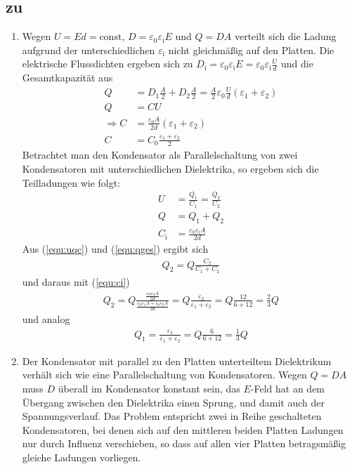 \documentclass[a4paper]{scrartcl}
\begin{document}
\subsection{zu }
\label{lsg:KondensatorDielektrika}
\begin{enumerate}[noitemsep]
  \item Wegen $U = Ed = \text{const}$, $D = \varepsilon_0\varepsilon_\text{i}E$ und $Q = DA$ verteilt sich die Ladung aufgrund der unterschiedlichen $\varepsilon_\text{i}$ nicht gleichmäßig auf den Platten. Die elektrische Flussdichten ergeben sich zu $D_\text{i} = \varepsilon_0\varepsilon_\text{i}E = \varepsilon_0\varepsilon_\text{i}\frac{U}{d}$ und die Gesamtkapazität aus 
    \begin{align*}
      Q &= D_1\frac{A}{2} + D_2\frac{A}{2} = \frac{A}{2} \varepsilon_0 \frac{U}{d}(\varepsilon_1+\varepsilon_2)\\
      Q &= CU\\
      \Rightarrow C & = \frac{\varepsilon_0A}{2d}(\varepsilon_1+\varepsilon_2)\\
      C&=C_0 \frac{\varepsilon_1+\varepsilon_2}{2}
    \end{align*}
    Betrachtet man den Kondensator als Parallelschaltung von zwei Kondensatoren mit unterschiedlichen Dielektrika, so ergeben sich die Teilladungen wie folgt:
    \begin{align}
      U &= \frac{Q_1}{C_1} = \frac{Q_2}{C_2} \label{equ:uqc}\\
      Q &= Q_1+Q_2 \label{equ:qges}\\
      C_\text{i} &= \frac{\varepsilon_0\varepsilon_\text{i}A}{2d} \label{equ:ci}
    \end{align}
    Aus (\ref{equ:uqc}) und (\ref{equ:qges}) ergibt sich
    \begin{align*}
      Q_2 = Q \frac{C_2}{C_1+C_2}
    \end{align*} und daraus mit (\ref{equ:ci})
    \begin{align*}
      Q_2 = Q \frac{ \frac{ \varepsilon_0 \varepsilon_2A} {2d}} {\frac{ \varepsilon_0\varepsilon_1A + \varepsilon_0\varepsilon_2A} {2d}} = Q\frac{\varepsilon_2}{\varepsilon_1+\varepsilon_2} = Q \frac{12}{6+12} = \frac{2}{3}Q
    \end{align*}
    und analog
    \begin{align*}
      Q_1 = \frac{\varepsilon_1}{\varepsilon_1+\varepsilon_2} = Q\frac{6}{6+12} = \frac{1}{3}Q
    \end{align*}
  \item Der Kondensator mit parallel zu den Platten unterteiltem Dielektrikum verhält sich wie eine Parallelschaltung von Kondensatoren. Wegen $Q=DA$ muss $D$ überall im Kondensator konstant sein, das $E$-Feld hat an dem Übergang zwischen den Dielektrika einen Sprung, und damit auch der Spannungsverlauf. Das Problem entspricht zwei in Reihe geschalteten Kondensatoren, bei denen sich auf den mittleren beiden Platten Ladungen nur durch Influenz verschieben, so dass auf allen vier Platten betragsmäßig gleiche Ladungen vorliegen.

\end{enumerate}
\end{document}
